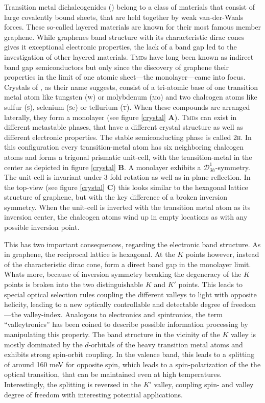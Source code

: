 Transition metal dichalcogenides (\tmds\!) belong to a class of materials that consist of large covalently bound sheets, that are held together by weak van-der-Waals forces. These so-called layered materials are known for their most famous member graphene. While graphenes band structure with its characteristic dirac cones gives it exceptional electronic properties, the lack of a band gap led to the investigation of other layered materials. \textsc{Tmd}s have long been known as indirect band gap semiconductors but only since the discovery of graphene their properties in the limit of one atomic sheet---the monolayer---came into focus. Crystals of \tmds, as their name suggests, consist of a tri-atomic base of one transition metal atom like tungsten (\textsc{w}) or molybdenum (\textsc{m}{\footnotesize o}) and two chalcogen atoms like sulfur (\textsc{s}), selenium (\textsc{s}{\footnotesize e}) or tellurium (\textsc{t}). When these compounds are arranged laterally, they form a \tmdg monolayer (see figure \ref{crystal} \textbf{A}). \textsc{Tmd}s can exist in different metastable phases, that have a different crystal structure as well as different electronic properties\cite{ouyang_phase_2015}. The stable semiconducting phase is called 2\textsc{h}. In this configuration every transition-metal atom has six neighboring chalcogen atoms and forms a trigonal prismatic unit-cell, with the transition-metal in the center as depicted in figure \ref{crystal} \textbf{B}. A \tmdg monolayer exhibits a $\mathcal{D}^1_{3h}$-symmetry. The unit-cell is invariant under 3-fold rotation as well as in-plane reflection. In the top-view (see figure \ref{crystal} \textbf{C}) this looks similar to the hexagonal lattice structure of graphene, but with the key difference of a broken inversion symmetry. When the unit-cell is inverted with the transition metal atom as its inversion center, the chalcogen atoms wind up in empty locations as with any possible inversion point.

This has two important consequences, regarding the electronic band structure. As in graphene, the reciprocal lattice is hexagonal. At the $K$ points however, instead of the characteristic dirac cone, \tmds form a direct band gap in the monolayer limit. Whats more, because of inversion symmetry breaking the degeneracy of the $K$ points is broken into the two distinguishable $K$ and $K'$ points. This leads to special optical selection rules coupling the different valleys to light with opposite helicity, leading to a new optically controllable and detectable degree of freedom---the valley-index. Analogous to electronics and spintronics, the term ``valleytronics'' has been coined to describe possible information processing by manipulating this property\cite{wang_electronics_2012, xiao_coupled_2012}. The band structure in the vicinity of the $K$ valley is mostly dominated by the $d$-orbitals of the heavy transition metal atoms and exhibits strong spin-orbit coupling. In the valence band, this leads to a splitting of around 160 meV for opposite spin, which leads to a spin-polarization of the the optical transition, that can be maintained even at high temperatures. Interestingly, the splitting is reversed in the $K'$ valley, coupling spin- and valley degree of freedom with interesting potential applications.

